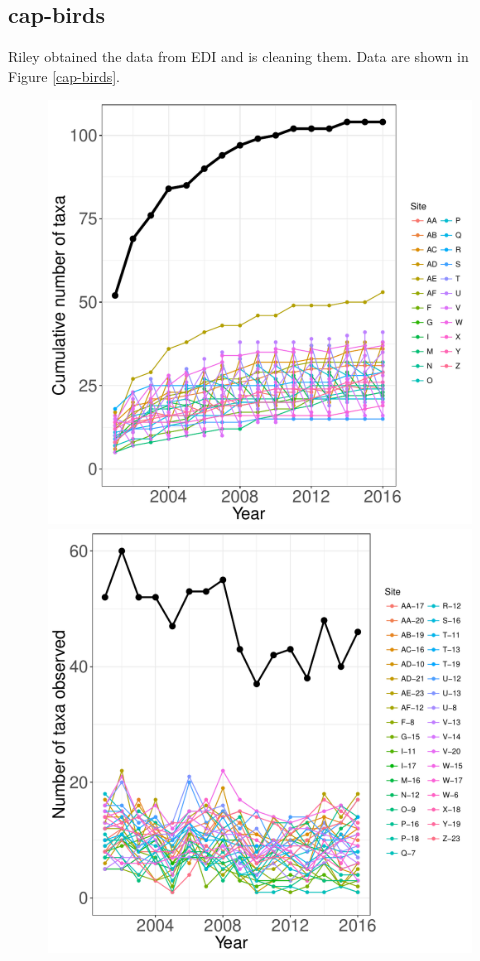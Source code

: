 \documentclass[11pt, oneside]{article}
\begin{document}
\subsection{cap-birds}
Riley obtained the data from EDI \citep{cap-birds} and is cleaning them.
Data are shown in Figure \ref{cap-birds}.




\begin{figure}[h!]
\centering
\includegraphics[scale = 0.4]{cap-birds-banville_species_accumulation_curve.pdf}
\includegraphics[scale = 0.4]{cap-birds-banville_num_taxa_over_time.pdf}

\end{figure}
\end{document}
